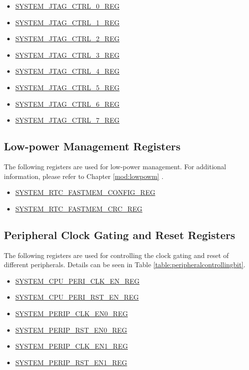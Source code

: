 \documentclass[main\_\_EN.tex]{subfiles}
\begin{document}
\begin{itemize}
    \item \hyperref[regdesc:SYSTEMJTAGCTRL0REG]{SYSTEM\_JTAG\_CTRL\_0\_REG}
    \item \hyperref[regdesc:SYSTEMJTAGCTRL1REG]{SYSTEM\_JTAG\_CTRL\_1\_REG}
    \item \hyperref[regdesc:SYSTEMJTAGCTRL2REG]{SYSTEM\_JTAG\_CTRL\_2\_REG}
    \item \hyperref[regdesc:SYSTEMJTAGCTRL3REG]{SYSTEM\_JTAG\_CTRL\_3\_REG}
    \item \hyperref[regdesc:SYSTEMJTAGCTRL4REG]{SYSTEM\_JTAG\_CTRL\_4\_REG}
    \item \hyperref[regdesc:SYSTEMJTAGCTRL5REG]{SYSTEM\_JTAG\_CTRL\_5\_REG}
    \item \hyperref[regdesc:SYSTEMJTAGCTRL6REG]{SYSTEM\_JTAG\_CTRL\_6\_REG}
    \item \hyperref[regdesc:SYSTEMJTAGCTRL7REG]{SYSTEM\_JTAG\_CTRL\_7\_REG}
\end{itemize}

\subsection{Low-power Management Registers}

The following registers are used for low-power management. For additional information, please refer to Chapter \ref{mod:lowpowm} \textit{}.

\begin{itemize}
    \item \hyperref[regdesc:SYSTEMRTCFASTMEMCONFIGREG]{SYSTEM\_RTC\_FASTMEM\_CONFIG\_REG}
    \item \hyperref[regdesc:SYSTEMRTCFASTMEMCRCREG]{SYSTEM\_RTC\_FASTMEM\_CRC\_REG}
\end{itemize}


\subsection{Peripheral Clock Gating and Reset Registers}

The following registers are used for controlling the clock gating and reset of different peripherals. Details can be seen in Table \ref{table:peripheralcontrollingbit}.

\begin{itemize}
    \item \hyperref[regdesc:SYSTEMCPUPERICLKENREG]{SYSTEM\_CPU\_PERI\_CLK\_EN\_REG}
    \item \hyperref[regdesc:SYSTEMCPUPERIRSTENREG]{SYSTEM\_CPU\_PERI\_RST\_EN\_REG}
    \item \hyperref[regdesc:SYSTEMPERIPCLKEN0REG]{SYSTEM\_PERIP\_CLK\_EN0\_REG}
    \item \hyperref[regdesc:SYSTEMPERIPRSTEN0REG]{SYSTEM\_PERIP\_RST\_EN0\_REG}
    \item \hyperref[regdesc:SYSTEMPERIPCLKEN1REG]{SYSTEM\_PERIP\_CLK\_EN1\_REG}
    \item \hyperref[regdesc:SYSTEMPERIPRSTEN1REG]{SYSTEM\_PERIP\_RST\_EN1\_REG}
\end{itemize}
\end{document}
